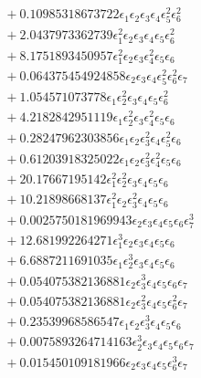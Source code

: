 \documentclass[10pt]{article}
\begin{document}
\begin{align*}
&{}  + 0.10985318673722 \epsilon_{1} \epsilon_{2} \epsilon_{3} \epsilon_{4} \epsilon_{5}^{2} \epsilon_{6}^{2} \\
&{}  + 2.0437973362739 \epsilon_{1}^{2} \epsilon_{2} \epsilon_{3} \epsilon_{4} \epsilon_{5} \epsilon_{6}^{2} \\
&{}  + 8.1751893450957 \epsilon_{1}^{2} \epsilon_{2} \epsilon_{3} \epsilon_{4}^{2} \epsilon_{5} \epsilon_{6} \\
&{}  + 0.064375454924858 \epsilon_{2} \epsilon_{3} \epsilon_{4} \epsilon_{5}^{2} \epsilon_{6}^{2} \epsilon_{7} \\
&{}  + 1.054571073778 \epsilon_{1} \epsilon_{2}^{2} \epsilon_{3} \epsilon_{4} \epsilon_{5} \epsilon_{6}^{2} \\
&{}  + 4.2182842951119 \epsilon_{1} \epsilon_{2}^{2} \epsilon_{3} \epsilon_{4}^{2} \epsilon_{5} \epsilon_{6} \\
&{}  + 0.28247962303856 \epsilon_{1} \epsilon_{2} \epsilon_{3}^{2} \epsilon_{4} \epsilon_{5}^{2} \epsilon_{6} \\
&{}  + 0.61203918325022 \epsilon_{1} \epsilon_{2} \epsilon_{3}^{2} \epsilon_{4}^{2} \epsilon_{5} \epsilon_{6} \\
&{}  + 20.17667195142 \epsilon_{1}^{2} \epsilon_{2}^{2} \epsilon_{3} \epsilon_{4} \epsilon_{5} \epsilon_{6} \\
&{}  + 10.21898668137 \epsilon_{1}^{2} \epsilon_{2} \epsilon_{3}^{2} \epsilon_{4} \epsilon_{5} \epsilon_{6} \\
&{}  + 0.0025750181969943 \epsilon_{2} \epsilon_{3} \epsilon_{4} \epsilon_{5} \epsilon_{6} \epsilon_{7}^{3} \\
&{}  + 12.681992264271 \epsilon_{1}^{3} \epsilon_{2} \epsilon_{3} \epsilon_{4} \epsilon_{5} \epsilon_{6} \\
&{}  + 6.6887211691035 \epsilon_{1} \epsilon_{2}^{3} \epsilon_{3} \epsilon_{4} \epsilon_{5} \epsilon_{6} \\
&{}  + 0.054075382136881 \epsilon_{2} \epsilon_{3}^{3} \epsilon_{4} \epsilon_{5} \epsilon_{6} \epsilon_{7} \\
&{}  + 0.054075382136881 \epsilon_{2} \epsilon_{3}^{2} \epsilon_{4} \epsilon_{5} \epsilon_{6}^{2} \epsilon_{7} \\
&{}  + 0.23539968586547 \epsilon_{1} \epsilon_{2} \epsilon_{3}^{3} \epsilon_{4} \epsilon_{5} \epsilon_{6} \\
&{}  + 0.0075893264714163 \epsilon_{2}^{3} \epsilon_{3} \epsilon_{4} \epsilon_{5} \epsilon_{6} \epsilon_{7} \\
&{}  + 0.015450109181966 \epsilon_{2} \epsilon_{3} \epsilon_{4} \epsilon_{5} \epsilon_{6}^{3} \epsilon_{7} \\

\end{align*}
\end{document}

